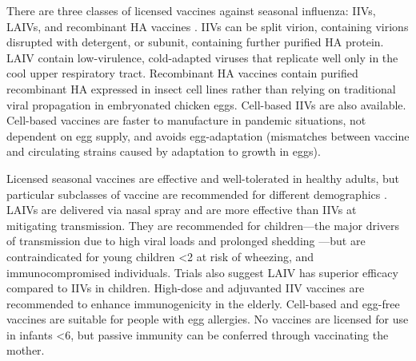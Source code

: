 There are three classes of licensed vaccines against seasonal influenza: \glspl{IIV}, \glspl{LAIV}, and recombinant \gls{HA} vaccines \autocite{houser2015InfluenzaVaccinesChallenges,krammer2019HumanAntibodyResponse}.
\Glspl{IIV} can be split virion, containing virions disrupted with detergent, or subunit, containing further purified \gls{HA} protein.
\Gls{LAIV} contain low-virulence, cold-adapted viruses that replicate well only in the cool upper respiratory tract.
Recombinant \gls{HA} vaccines contain purified recombinant \gls{HA} expressed in insect cell lines rather than relying on traditional viral propagation in embryonated chicken eggs.
Cell-based \glspl{IIV} are also available. 
Cell-based vaccines are faster to manufacture in pandemic situations, not dependent on egg supply, and avoids egg-adaptation (mismatches between vaccine and circulating strains caused by adaptation to growth in eggs).

Licensed seasonal vaccines are effective and well-tolerated in healthy adults, but particular subclasses of vaccine are recommended for different demographics \autocite{bresee2018InactivatedInfluenzaVaccines,luke2018InfluenzaVaccineLive,poland2018PersonalizedVaccinologyReview,ramsay2020InfluenzaGreenBook}.
\glspl{LAIV} are delivered via nasal spray and are more effective than \glspl{IIV} at mitigating transmission. 
They are recommended for children---the major drivers of transmission due to high viral loads and prolonged shedding \autocite{krammer2018Influenza,bresee2018InactivatedInfluenzaVaccines}---but are contraindicated for young children \SI{<2}{\year} at risk of wheezing, and immunocompromised individuals.
Trials also suggest \gls{LAIV} has superior efficacy compared to \glspl{IIV} in children.
High-dose and adjuvanted \gls{IIV} vaccines are recommended to enhance immunogenicity in the elderly.
Cell-based and egg-free vaccines are suitable for people with egg allergies.
No vaccines are licensed for use in infants \SI{<6}{\month}, but passive immunity can be conferred through vaccinating the mother.

